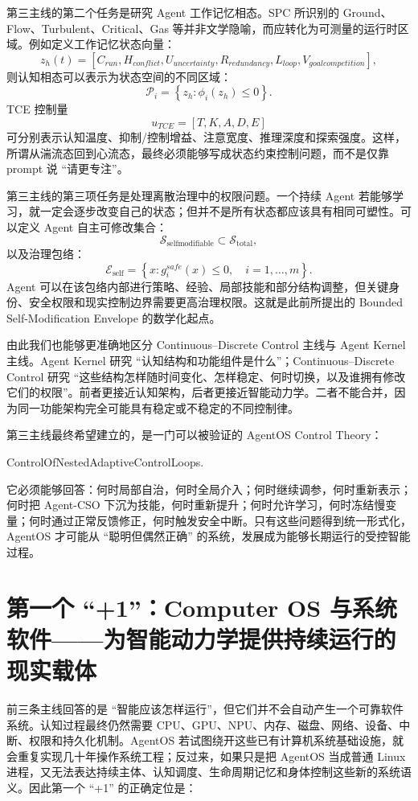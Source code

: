 第三主线的第二个任务是研究 Agent 工作记忆相态。SPC 所识别的 Ground、Flow、Turbulent、Critical、Gas 等并非文学隐喻，而应转化为可测量的运行时区域。例如定义工作记忆状态向量：
\[
z_h(t)
=
\left[
C_{run},
H_{conflict},
U_{uncertainty},
R_{redundancy},
L_{loop},
V_{goalcompetition}
\right],
\]
则认知相态可以表示为状态空间的不同区域：
\[
\mathcal P_i
=
\left\{
z_h:
\phi_i(z_h)\leq 0
\right\}.
\]
TCE 控制量
\[
u_{TCE}
=
\left[
T,
K,
A,
D,
E
\right]
\]
可分别表示认知温度、抑制/控制增益、注意宽度、推理深度和探索强度。这样，所谓从湍流态回到心流态，最终必须能够写成状态约束控制问题，而不是仅靠 prompt 说 ``请更专注''。

第三主线的第三项任务是处理离散治理中的权限问题。一个持续 Agent 若能够学习，就一定会逐步改变自己的状态；但并不是所有状态都应该具有相同可塑性。可以定义 Agent 自主可修改集合：
\[
\mathcal S_{\mathrm{selfmodifiable}}
\subset
\mathcal S_{\mathrm{total}},
\]
以及治理包络：
\[
\boxed{
\mathcal E_{\mathrm{self}}
=
\left\{
x:
g_i^{safe}(x)\leq0,
\quad i=1,\ldots,m
\right\}.
}
\]
Agent 可以在该包络内部进行策略、经验、局部技能和部分结构调整，但关键身份、安全权限和现实控制边界需要更高治理权限。这就是此前所提出的 Bounded Self-Modification Envelope 的数学化起点。

由此我们也能够更准确地区分 Continuous--Discrete Control 主线与 Agent Kernel 主线。Agent Kernel 研究 ``认知结构和功能组件是什么''；Continuous--Discrete Control 研究 ``这些结构怎样随时间变化、怎样稳定、何时切换，以及谁拥有修改它们的权限''。前者更接近认知架构，后者更接近智能动力学。二者不能合并，因为同一功能架构完全可能具有稳定或不稳定的不同控制律。

第三主线最终希望建立的，是一门可以被验证的 AgentOS Control Theory：
\begin{statementbox}
ControlOfNestedAdaptiveControlLoops.
\end{statementbox}
它必须能够回答：何时局部自治，何时全局介入；何时继续调参，何时重新表示；何时把 Agent-CSO 下沉为技能，何时重新提升；何时允许学习，何时冻结慢变量；何时通过正常反馈修正，何时触发安全中断。只有这些问题得到统一形式化，AgentOS 才可能从 ``聪明但偶然正确'' 的系统，发展成为能够长期运行的受控智能过程。

\section{第一个 ``+1''：Computer OS 与系统软件——为智能动力学提供持续运行的现实载体}
\label{sec:roadmap-system-software}

前三条主线回答的是 ``智能应该怎样运行''，但它们并不会自动产生一个可靠软件系统。认知过程最终仍然需要 CPU、GPU、NPU、内存、磁盘、网络、设备、中断、权限和持久化机制。AgentOS 若试图绕开这些已有计算机系统基础设施，就会重复实现几十年操作系统工程；反过来，如果只是把 AgentOS 当成普通 Linux 进程，又无法表达持续主体、认知调度、生命周期记忆和身体控制这些新的系统语义。因此第一个 ``+1'' 的正确定位是：
\begin{statementbox}
\centering
{}
\end{statementbox}

